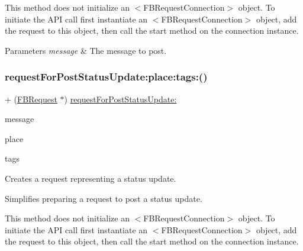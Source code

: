 This method does not initialize an $<$\+F\+B\+Request\+Connection$>$ object. To initiate the A\+PI call first instantiate an $<$\+F\+B\+Request\+Connection$>$ object, add the request to this object, then call the {\ttfamily start} method on the connection instance.


\begin{DoxyParams}{Parameters}
{\em message} & The message to post. \\
\hline
\end{DoxyParams}
\mbox{\label{interfaceFBRequest_a5560f9786dcf54ca907153c611f991ed}} 
\subsubsection{\texorpdfstring{request\+For\+Post\+Status\+Update\+:place\+:tags\+:()}{requestForPostStatusUpdate:place:tags:()}\hspace{0.1cm}{\footnotesize\ttfamily [1/5]}}
{\footnotesize\ttfamily + (\hyperlink{interfaceFBRequest}{F\+B\+Request} $\ast$) \hyperlink{interfaceFBRequest_a0a745a53f4764835bd0945bd66fe10fd}{request\+For\+Post\+Status\+Update\+:} \begin{DoxyParamCaption}\item[{(N\+S\+String $\ast$)}]{message }\item[{place:(id)}]{place }\item[{tags:(id$<$ N\+S\+Fast\+Enumeration $>$)}]{tags }\end{DoxyParamCaption}}

Creates a request representing a status update.

Simplifies preparing a request to post a status update.

This method does not initialize an $<$\+F\+B\+Request\+Connection$>$ object. To initiate the A\+PI call first instantiate an $<$\+F\+B\+Request\+Connection$>$ object, add the request to this object, then call the {\ttfamily start} method on the connection instance.


